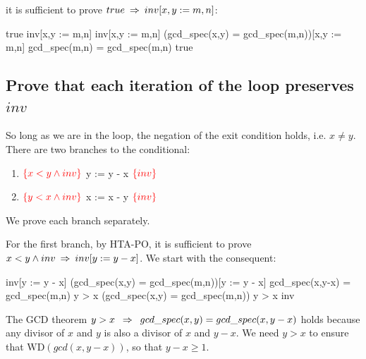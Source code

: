 \documentclass[runningheads,12pt]{article}
\def\WD{\textrm{WD}}
\def\assert#1{\textcolor{red}{ {\{} {#1} {\}}}}
\begin{document}
\noindent it is sufficient to prove $true \; \mathbin\Rightarrow \; inv[x,y := m,n]$:
\vspace{-6pt}
\begin{calculation}
	true \1\limp inv[x,y := m,n]
	inv[x,y := m,n]
	(gcd\_spec(x,y) = gcd\_spec(m,n))[x,y := m,n]
	gcd\_spec(m,n) = gcd\_spec(m,n)
	true \qquad\blacksquare
\end{calculation}

	
\subsection{Prove that each iteration of the loop preserves $inv$}

So long as we are in the loop, the negation of the exit condition holds, i.e. $x \neq y$. There are two branches to the conditional:

\begin{enumerate}
  \item $\assert{ x < y \land inv}$ y := y - x $\assert{ inv}$
  \item $\assert{ y < x \land inv}$ x := x - y $\assert{ inv}$
\end{enumerate}

\noindent We prove each branch separately. 

For the first branch, by HTA-PO, it is sufficient to prove $x < y \land inv \; \mathbin\Rightarrow \; inv[y := y - x]$. We start with the consequent:
		
\begin{calculation}
	inv[y := y - x]
	(gcd\_spec(x,y) \1= gcd\_spec(m,n))[y := y - x]
	gcd\_spec(x,y-x) \1= gcd\_spec(m,n)
	y > x \limp (gcd\_spec(x,y) \1= gcd\_spec(m,n))
	y > x \1\limp inv \qquad\blacksquare
\end{calculation}

The GCD theorem $y > x \; \; \mathbin\Rightarrow \; \; gcd\_spec(x,y) = gcd\_spec(x,y-x)$ holds because any divisor of $x$ and $y$ is also a divisor of $x$ and $y-x$. We need $y > x$ to ensure that $\WD(gcd(x,y-x))$, so that $y-x \geq 1$.
\end{document}
